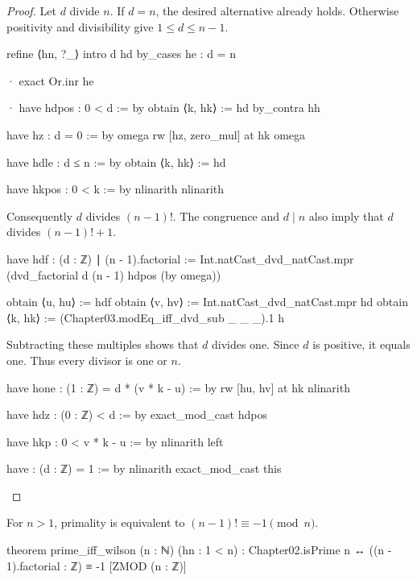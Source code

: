 \begin{proof}
  Let $d$ divide $n$.
  If $d=n$, the desired alternative already holds.
  Otherwise positivity and divisibility give $1\le d\le n-1$.

  \begin{lean}
    refine ⟨hn, ?_⟩
    intro d hd
    by_cases he : d = n

    · exact Or.inr he

    · have hdpos : 0 < d := by
        obtain ⟨k, hk⟩ := hd
        by_contra hh

        have hz : d = 0 := by
          omega
        rw [hz, zero_mul] at hk
        omega

      have hdle : d ≤ n := by
        obtain ⟨k, hk⟩ := hd

        have hkpos : 0 < k := by
          nlinarith
        nlinarith
  \end{lean}

  Consequently $d$ divides $(n-1)!
  $.
  The congruence and $d\mid n$ also imply that $d$ divides $(n-1)!
    +1$.

  \begin{lean}
    have hdf : (d : ℤ) ∣ (n - 1).factorial :=
      Int.natCast_dvd_natCast.mpr (dvd_factorial d (n - 1) hdpos (by omega))

    obtain ⟨u, hu⟩ := hdf
    obtain ⟨v, hv⟩ := Int.natCast_dvd_natCast.mpr hd
    obtain ⟨k, hk⟩ := (Chapter03.modEq_iff_dvd_sub _ _ _).1 h
  \end{lean}

  Subtracting these multiples shows that $d$ divides one.
  Since $d$ is positive, it equals one.
  Thus every divisor is one or $n$.

  \begin{lean}
    have hone : (1 : ℤ) = d * (v * k - u) := by
      rw [hu, hv] at hk
      nlinarith

    have hdz : (0 : ℤ) < d := by
      exact_mod_cast hdpos

    have hkp : 0 < v * k - u := by
      nlinarith
    left

    have : (d : ℤ) = 1 := by
      nlinarith
    exact_mod_cast this
  \end{lean}
\end{proof}

\begin{theorem}
  \label{ent:thm:prime-iff-wilson}
  For $n>1$, primality is equivalent to $(n-1)!
    \equiv-1\pmod n$.

  \begin{lean}
    theorem prime_iff_wilson (n : ℕ) (hn : 1 < n) :
        Chapter02.isPrime n ↔ ((n - 1).factorial : ℤ) ≡ -1 [ZMOD (n : ℤ)]
  \end{lean}
\end{theorem}

